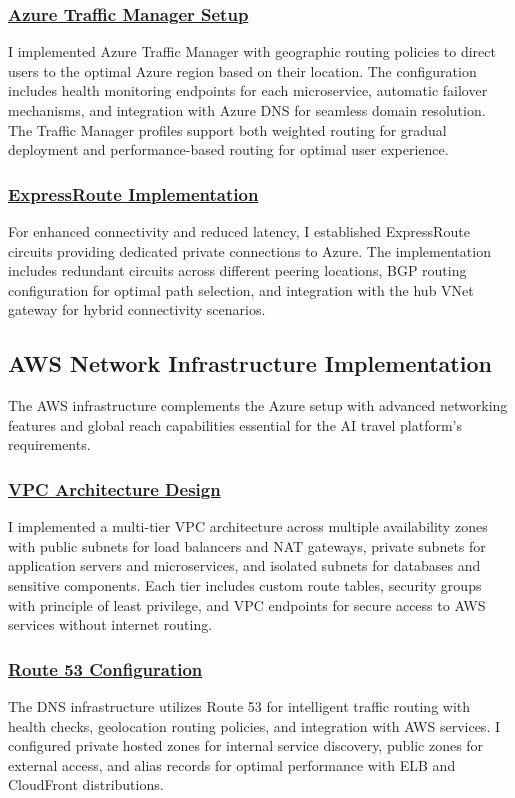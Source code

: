 \subsubsection*{\underline{Azure Traffic Manager Setup}}
I implemented Azure Traffic Manager with geographic routing policies to direct users to the optimal Azure region based on their location. The configuration includes health monitoring endpoints for each microservice, automatic failover mechanisms, and integration with Azure DNS for seamless domain resolution. The Traffic Manager profiles support both weighted routing for gradual deployment and performance-based routing for optimal user experience.

\subsubsection*{\underline{ExpressRoute Implementation}}
For enhanced connectivity and reduced latency, I established ExpressRoute circuits providing dedicated private connections to Azure. The implementation includes redundant circuits across different peering locations, BGP routing configuration for optimal path selection, and integration with the hub VNet gateway for hybrid connectivity scenarios.

\subsection{AWS Network Infrastructure Implementation}
The AWS infrastructure complements the Azure setup with advanced networking features and global reach capabilities essential for the AI travel platform's requirements.

\subsubsection*{\underline{VPC Architecture Design}}
I implemented a multi-tier VPC architecture across multiple availability zones with public subnets for load balancers and NAT gateways, private subnets for application servers and microservices, and isolated subnets for databases and sensitive components. Each tier includes custom route tables, security groups with principle of least privilege, and VPC endpoints for secure access to AWS services without internet routing.

\subsubsection*{\underline{Route 53 Configuration}}
The DNS infrastructure utilizes Route 53 for intelligent traffic routing with health checks, geolocation routing policies, and integration with AWS services. I configured private hosted zones for internal service discovery, public zones for external access, and alias records for optimal performance with ELB and CloudFront distributions.

